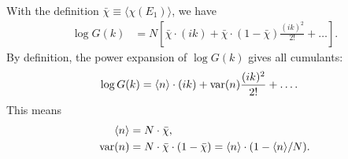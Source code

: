 \documentclass[aip,jcp,preprint,superscriptaddress]{revtex4-1}
\begin{document}
With the definition $\bar\chi \equiv \langle \chi( E_1 ) \rangle$,
we have
%
\begin{align*}
\log G(k)
&=
N
\left[
 \bar\chi \cdot (i k)
+
  \bar\chi \cdot
  \left(
    1 - \bar\chi
  \right)
  \frac{ (i k)^2 } { 2! }
+ \dots
\right]
.
\end{align*}
%
By definition,
the power expansion of $\log G(k)$
gives all cumulants\cite{vankampen}:
\begin{align*}
\log G(k)
&=
 \langle n \rangle \cdot (i k)
+
\mathrm{var}(n)
\frac{ (i k)^2 } { 2! }
+ \dots
.
\end{align*}
%
This means
%
\begin{align*}
\langle n \rangle
&=
N \cdot \bar\chi,
\\
\mathrm{var}(n)
&=
N \cdot \bar\chi \cdot (1 - \bar\chi)
=
\langle n \rangle \cdot ( 1 - \langle n \rangle/N).
\end{align*}











\end{document}
